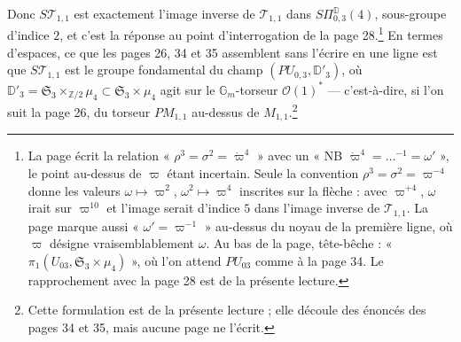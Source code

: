 \documentclass[11pt,a4paper]{article}
\begin{document}
Donc $S\mathcal{T}_{1,1}$ est exactement l'image inverse de $\mathcal{T}_{1,1}$
dans $S\Pi^{\mathbb{D}}_{0,3}(4)$, sous-groupe d'indice $2$, et c'est la réponse
au point d'interrogation de la page 28.\footnote{La page écrit la relation
« $\rho^3 = \sigma^2 = \dot\varpi^4$ » avec un « NB $\dot\varpi^4 =
\ldots^{-1} = \omega'$ », le point au-dessus de $\varpi$ étant incertain. Seule la
convention $\rho^3 = \sigma^2 = \varpi^{-4}$ donne les valeurs
$\omega \mapsto \varpi^2$, $\omega^2 \mapsto \varpi^4$ inscrites sur la flèche :
avec $\varpi^{+4}$, $\omega$ irait sur $\varpi^{10}$ et l'image serait d'indice
$5$ dans l'image inverse de $\mathcal{T}_{1,1}$. La page marque aussi
« $\omega' = \varpi^{-1}$ » au-dessus du noyau de la première ligne, où $\varpi$
désigne vraisemblablement $\omega$. Au bas de la page, tête-bêche :
« $\pi_1(U_{03}, \mathfrak{S}_3 \times \mu_4)$ », où l'on attend $PU_{03}$ comme à
la page 34. Le rapprochement avec la page 28 est de la présente lecture.} En
termes d'espaces, ce que les pages 26, 34 et 35 assemblent sans l'écrire en une
ligne est que $S\mathcal{T}_{1,1}$ est le groupe fondamental du champ
$(PU_{0,3}, \mathbb{D}'_3)$, où $\mathbb{D}'_3 = \mathfrak{S}_3
\times_{\mathbb{Z}/2} \mu_4 \subset \mathfrak{S}_3 \times \mu_4$ agit sur le
$\mathbb{G}_m$-torseur $\mathcal{O}(1)^{*}$ — c'est-à-dire, si l'on suit la page
26, du torseur $PM_{1,1}$ au-dessus de $M_{1,1}$.\footnote{Cette formulation est
de la présente lecture ; elle découle des énoncés des pages 34 et 35, mais aucune
page ne l'écrit.}
\end{document}
